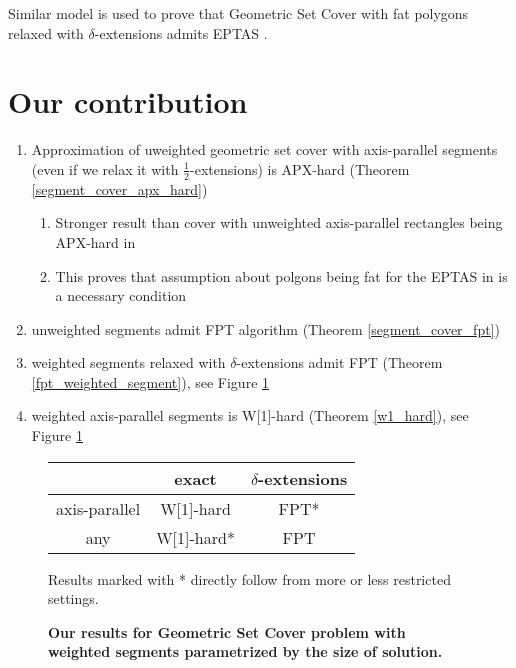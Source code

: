 Similar model is used to prove that Geometric Set Cover with fat polygons
relaxed with $\delta$-extensions admits EPTAS \cite{harpeled12}.

\section*{Our contribution}
\begin{enumerate}
\item Approximation of uweighted geometric set cover with axis-parallel segments
(even if we relax it with  $\frac{1}{2}$-extensions) is APX-hard
(Theorem \ref{segment_cover_apx_hard})
	\begin{enumerate}
	\item Stronger result than cover with unweighted axis-parallel
	rectangles being APX-hard in \cite{rectangles_apx_hard}
	\item This proves that assumption about polgons being fat for
	the EPTAS in \cite{harpeled12} is a necessary condition
	\end{enumerate}
\item unweighted segments admit FPT algorithm (Theorem \ref{segment_cover_fpt})
\item weighted segments relaxed with $\delta$-extensions admit FPT (Theorem \ref{fpt_weighted_segment}),
    see Figure \ref{tab:weighted_fpt}
\item weighted axis-parallel segments is W[1]-hard (Theorem \ref{w1_hard}),
    see Figure \ref{tab:weighted_fpt}

\end{enumerate}


\begin{figure}[h]
\begin{center}
\begin{tabular}{ | c | c | c | }
\hline
                & exact     & $\delta$-extensions \\ 
\hline                
 axis-parallel   & W[1]-hard & FPT* \\  
\hline                
 any             & W[1]-hard* & FPT \\
\hline                
\end{tabular}
\caption{\textbf{Our results for Geometric Set Cover problem with weighted segments 
parametrized by the size of solution.}}

Results marked with * directly follow from more or less restricted settings.
\label{tab:weighted_fpt}
\end{center}
\end{figure}


